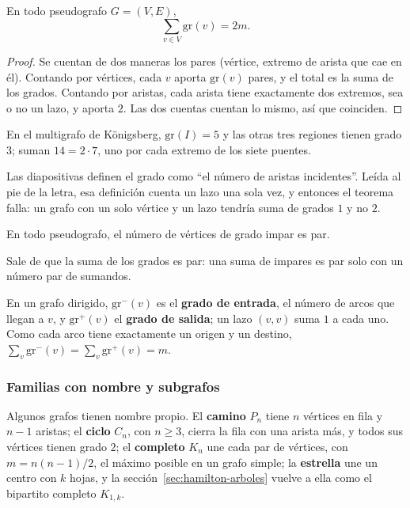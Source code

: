 \documentclass[11pt,letterpaper]{article}
\begin{document}
\begin{teorema}
  \label{teo:apreton-manos}
  En todo pseudografo $G = (V, E)$,
  \[
    \sum_{v \in V} \text{gr}(v) = 2m .
  \]
\end{teorema}

\begin{proof}
  Se cuentan de dos maneras los pares (vértice, extremo de arista que
  cae en él). Contando por vértices, cada $v$ aporta $\text{gr}(v)$
  pares, y el total es la suma de los grados. Contando por aristas,
  cada arista tiene exactamente dos extremos, sea o no un lazo, y
  aporta $2$. Las dos cuentas cuentan lo mismo, así que coinciden.
\end{proof}

En el multigrafo de Königsberg, $\text{gr}(I) = 5$ y las otras tres
regiones tienen grado $3$; suman $14 = 2 \cdot 7$, uno por cada
extremo de los siete puentes.

\begin{ojo}
  Las diapositivas definen el grado como ``el número de aristas
  incidentes''. Leída al pie de la letra, esa definición cuenta un lazo
  una sola vez, y entonces el teorema falla: un grafo con un solo
  vértice y un lazo tendría suma de grados $1$ y no $2$.
\end{ojo}

\begin{corolario}
  \label{cor:impares-par}
  En todo pseudografo, el número de vértices de grado impar es par.
\end{corolario}


Sale de que la suma de los grados es par: una suma de impares es par
solo con un número par de sumandos.

En un grafo dirigido, $\text{gr}^{-}(v)$ es el \textbf{grado de
entrada}, el número de arcos que llegan a $v$, y $\text{gr}^{+}(v)$ el
\textbf{grado de salida}; un lazo $(v, v)$ suma $1$ a cada uno. Como
cada arco tiene exactamente un origen y un destino,
$\sum_{v} \text{gr}^{-}(v) = \sum_{v} \text{gr}^{+}(v) = m$.

\subsubsection*{Familias con nombre y subgrafos}

Algunos grafos tienen nombre propio. El \textbf{camino} $P_n$ tiene
$n$ vértices en fila y $n - 1$ aristas; el \textbf{ciclo} $C_n$, con
$n \geq 3$, cierra la fila con una arista más, y todos sus vértices
tienen grado $2$; el \textbf{completo} $K_n$ une cada par de
vértices, con $m = n(n-1)/2$, el máximo posible en un grafo simple; la
\textbf{estrella} une un centro con $k$ hojas, y la
sección~\ref{sec:hamilton-arboles} vuelve a ella como el bipartito
completo $K_{1,k}$.
\end{document}
